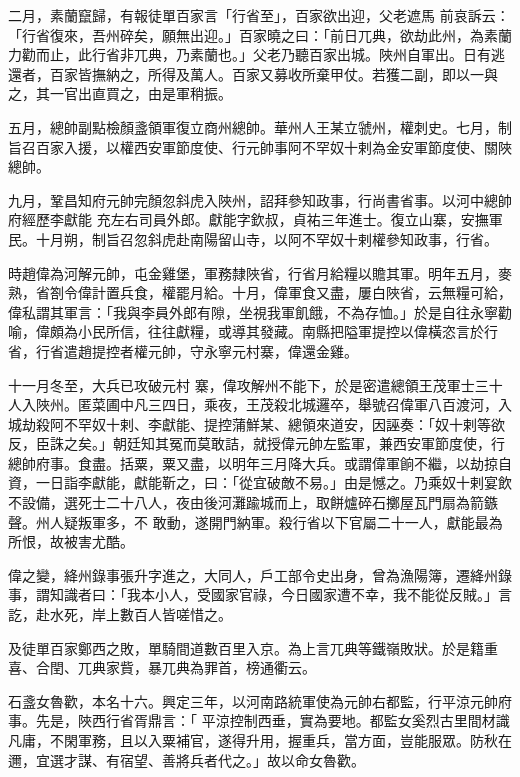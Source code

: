 \begin{pinyinscope}
 二月，素蘭竄歸，有報徒單百家言「行省至」，百家欲出迎，父老遮馬
 前哀訴云：「行省復來，吾州碎矣，願無出迎。」百家曉之曰：「前日兀典，欲劫此州，為素蘭力勸而止，此行省非兀典，乃素蘭也。」父老乃聽百家出城。陜州自軍出。日有逃還者，百家皆撫納之，所得及萬人。百家又募收所棄甲仗。若獲二副，即以一與之，其一官出直買之，由是軍稍振。



 五月，總帥副點檢顏盞領軍復立商州總帥。華州人王某立虢州，權刺史。七月，制旨召百家入援，以權西安軍節度使、行元帥事阿不罕奴十剌為金安軍節度使、關陜總帥。



 九月，鞏昌知府元帥完顏忽斜虎入陜州，詔拜參知政事，行尚書省事。以河中總帥府經歷李獻能
 充左右司員外郎。獻能字欽叔，貞祐三年進士。復立山寨，安撫軍民。十月朔，制旨召忽斜虎赴南陽留山寺，以阿不罕奴十剌權參知政事，行省。



 時趙偉為河解元帥，屯金雞堡，軍務隸陜省，行省月給糧以贍其軍。明年五月，麥熟，省劄令偉計置兵食，權罷月給。十月，偉軍食又盡，屢白陜省，云無糧可給，偉私謂其軍言：「我與李員外郎有隙，坐視我軍飢餓，不為存恤。」於是自往永寧勸喻，偉頗為小民所信，往往獻糧，或導其發藏。南縣把隘軍提控以偉橫恣言於行省，行省遣趙提控者權元帥，守永寧元村寨，偉還金雞。



 十一月冬至，大兵已攻破元村
 寨，偉攻解州不能下，於是密遣總領王茂軍士三十人入陜州。匿菜圃中凡三四日，乘夜，王茂殺北城邏卒，舉號召偉軍八百渡河，入城劫殺阿不罕奴十剌、李獻能、提控蒲鮮某、總領來道安，因誣奏：「奴十剌等欲反，臣誅之矣。」朝廷知其冤而莫敢詰，就授偉元帥左監軍，兼西安軍節度使，行總帥府事。食盡。括粟，粟又盡，以明年三月降大兵。或謂偉軍餉不繼，以劫掠自資，一日詣李獻能，獻能靳之，曰：「從宜破敵不易。」由是憾之。乃乘奴十剌宴飲不設備，選死士二十八人，夜由後河灘踰城而上，取餅爐碎石擲屋瓦門扇為箭鏃聲。州人疑叛軍多，不
 敢動，遂開門納軍。殺行省以下官屬二十一人，獻能最為所恨，故被害尤酷。



 偉之變，絳州錄事張升字進之，大同人，戶工部令史出身，曾為漁陽簿，遷絳州錄事，謂知識者曰：「我本小人，受國家官祿，今日國家遭不幸，我不能從反賊。」言訖，赴水死，岸上數百人皆嗟惜之。



 及徒單百家鄭西之敗，單騎間道數百里入京。為上言兀典等鐵嶺敗狀。於是籍重喜、合閏、兀典家貲，暴兀典為罪首，榜通衢云。



 石盞女魯歡，本名十六。興定三年，以河南路統軍使為元帥右都監，行平涼元帥府事。先是，陜西行省胥鼎言：「
 平涼控制西垂，實為要地。都監女奚烈古里間材識凡庸，不閑軍務，且以入粟補官，遂得升用，握重兵，當方面，豈能服眾。防秋在邇，宜選才謀、有宿望、善將兵者代之。」故以命女魯歡。




\end{pinyinscope}
